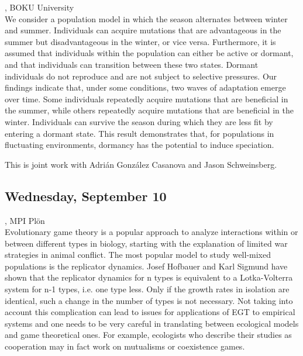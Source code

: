 \documentclass[12pt,a4paper]{article}
\begin{document}
\bigskip\bigskip

, BOKU University \\[2ex] We consider a population model in which the season alternates between winter and summer. Individuals can acquire mutations that are advantageous in the summer but disadvantageous in the winter, or vice versa.  Furthermore, it is assumed that individuals within the population can either be active or dormant, and that individuals can transition between these two states.  Dormant individuals do not reproduce and are not subject to selective pressures. Our findings indicate that, under some conditions, two waves of adaptation emerge over time. Some individuals repeatedly acquire mutations that are beneficial in the summer, while others repeatedly acquire mutations that are beneficial in the winter. Individuals can survive the season during which they are less fit by entering a dormant state. This result demonstrates that, for populations in fluctuating environments, dormancy has the potential to induce speciation. 

 This is joint work with Adrián González Casanova and Jason Schweinsberg. 

\bigskip\bigskip

\newpage
\subsection*{\sffamily Wednesday, September 10}
\bigskip\bigskip
{}, MPI Plön \\[2ex] Evolutionary game theory is a popular approach to analyze interactions within or between different types in biology, starting with the explanation of limited war strategies in animal conflict. The most popular model to study well-mixed populations is the replicator dynamics. Josef Hofbauer and Karl Sigmund have shown that the replicator dynamics for n types is equivalent to a Lotka-Volterra system for n-1 types, i.e. one type less. Only if the growth rates in isolation are identical, such a change in the number of types is not necessary. Not taking into account this complication can lead to issues for applications of EGT to empirical systems and one needs to be very careful in translating between ecological models and game theoretical ones. For example, ecologists who describe their studies as cooperation may in fact work on mutualisms or coexistence games. 
\end{document}
